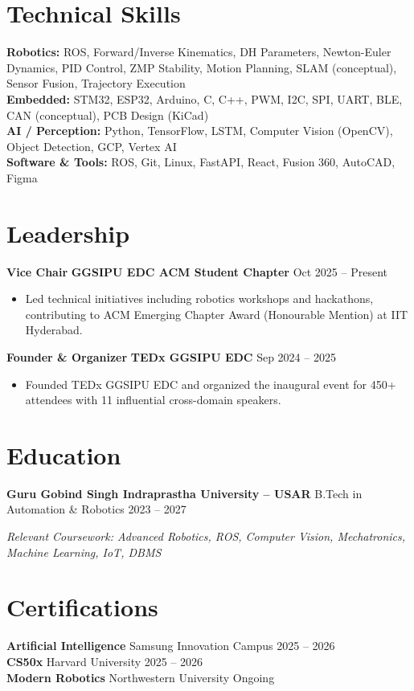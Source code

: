 \documentclass[10pt,letterpaper]{article}
\begin{document}
\section*{Technical Skills}

\textbf{Robotics:} ROS, Forward/Inverse Kinematics, DH Parameters, Newton-Euler Dynamics, PID Control, ZMP Stability, Motion Planning, SLAM (conceptual), Sensor Fusion, Trajectory Execution \\
\textbf{Embedded:} STM32, ESP32, Arduino, C, C++, PWM, I2C, SPI, UART, BLE, CAN (conceptual), PCB Design (KiCad) \\
\textbf{AI / Perception:} Python, TensorFlow, LSTM, Computer Vision (OpenCV), Object Detection, GCP, Vertex AI \\
\textbf{Software \& Tools:} ROS, Git, Linux, FastAPI, React, Fusion 360, AutoCAD, Figma

\section*{Leadership}

\textbf{Vice Chair} \textbar{} \textbf{GGSIPU EDC ACM Student Chapter} \hfill Oct 2025 -- Present
\begin{itemize}
    \item Led technical initiatives including robotics workshops and hackathons, contributing to ACM Emerging Chapter Award (Honourable Mention) at IIT Hyderabad.
\end{itemize}
\vspace{1pt}
\textbf{Founder \& Organizer} \textbar{} \textbf{TEDx GGSIPU EDC} \hfill Sep 2024 -- 2025
\begin{itemize}
    \item Founded TEDx GGSIPU EDC and organized the inaugural event for 450+ attendees with 11 influential cross-domain speakers.
\end{itemize}

\section*{Education}

\textbf{Guru Gobind Singh Indraprastha University -- USAR} \textbar{} B.Tech in Automation \& Robotics \hfill 2023 -- 2027

\textit{Relevant Coursework: Advanced Robotics, ROS, Computer Vision, Mechatronics, Machine Learning, IoT, DBMS}

\section*{Certifications}

\textbf{Artificial Intelligence} \textbar{} Samsung Innovation Campus \hfill 2025 -- 2026 \\
\textbf{CS50x} \textbar{} Harvard University \hfill 2025 -- 2026 \\
\textbf{Modern Robotics} \textbar{} Northwestern University \hfill Ongoing
\end{document}
